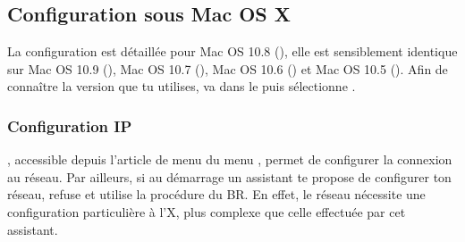 



\subsection{Configuration sous Mac OS X}

La configuration est d\'etaill\'ee pour Mac OS 10.8 (), elle est sensiblement identique sur Mac OS 10.9 (),  Mac OS 10.7 (), Mac OS 10.6 () et Mac OS 10.5 ().
Afin de conna\^itre la version que tu utilises, va dans le  puis s\'electionne .

\subsubsection{Configuration IP}

 , accessible depuis l'article de menu  du menu , permet de configurer la connexion au r\'eseau. Par ailleurs, si au d\'emarrage un assistant te propose de configurer ton r\'eseau, refuse et utilise la proc\'edure du BR. En effet, le r\'eseau n\'ecessite une configuration particuli\`ere \`a l'X, plus complexe que celle effectu\'ee par cet assistant.


